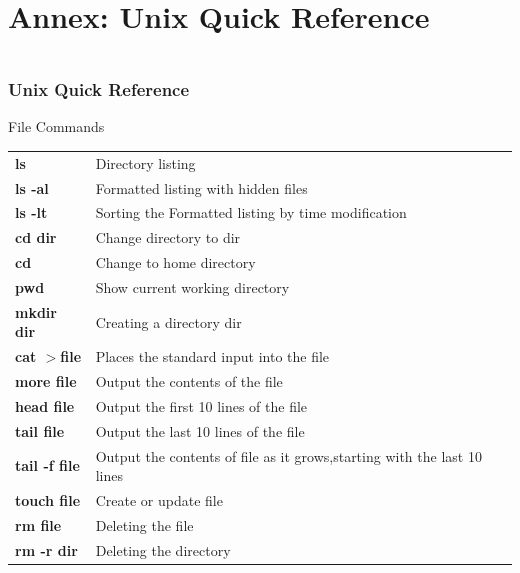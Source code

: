 \documentclass[10pt, hyperref={unicode=true,pdfusetitle, bookmarks=true,bookmarksnumbered=false,bookmarksopen=false, breaklinks=false,pdfborder={0 0l 1},backref=true,colorlinks=true,linkcolor=darkblue,pageanchor}]{beamer}
\begin{document}
\section{{\bf{Annex: Unix Quick Reference}}}
\begin{frame}
\begin{small}
\begin{columns}[c] 
\tableofcontents[sections={1-8},currentsection, currentsubsection]
\tableofcontents[sections={9-16},currentsection, currentsubsection]
\end{columns}
\end{small}
\end{frame}
\begin{frame}
\frametitle{Unix Quick Reference}
\begin{block}{File Commands}

\begin{tabular}{ll}
\textbf{ls}              & Directory listing                                                     \tabularnewline
\textbf{ls -al}          & Formatted listing with hidden files                                   \tabularnewline
\textbf{ls -lt}          & Sorting the Formatted listing by time modification                    \tabularnewline
\textbf{cd dir}          & Change directory to dir                                               \tabularnewline
\textbf{cd}              & Change to home directory                                              \tabularnewline
\textbf{pwd}             & Show current working directory                                        \tabularnewline
\textbf{mkdir dir}       & Creating a directory dir                                              \tabularnewline
\textbf{cat $>$file}     & Places the standard input into the file                               \tabularnewline
\textbf{more file}       & Output the contents of the file                                       \tabularnewline
\textbf{head file}       & Output the first 10 lines of the file                                 \tabularnewline
\textbf{tail file}       & Output the last 10 lines of the file                                  \tabularnewline
\textbf{tail -f file}    & Output the contents of file as it grows,starting with the last 10 lines \tabularnewline
\textbf{touch file}      & Create or update file                                                 \tabularnewline
\textbf{rm file}         & Deleting the file                                                     \tabularnewline
\textbf{rm -r dir}       & Deleting the directory                                                \tabularnewline
\end{tabular}

\end{block}
\end{frame}
\end{document}

